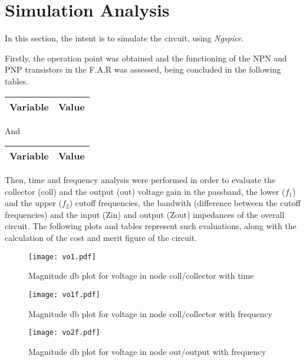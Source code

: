 \section{Simulation Analysis}
\label{sec:simulation}

In this section, the intent is to simulate the circuit, using \textit{Ngspice}. 

Firstly, the operation point was obtained and the functioning of the NPN and PNP transistors in the F.A.R was assessed, being concluded in the following tables.

\begin{center}
    \begin{tabular}{|l|r|}
      \hline    
      {\bf Variable} & {\bf Value} \\ \hline
      
    \end{tabular}
\end{center}

And

\begin{center}
    \begin{tabular}{|l|r|}
      \hline    
      {\bf Variable} & {\bf Value} \\ \hline
      
    \end{tabular}
\end{center}

Then, time and frequency analysis were performed in order to evaluate the collector (coll) and the output (out) voltage gain in the passband, the lower ($f_1$) and the upper ($f_2$) cutoff frequencies, the bandwith (difference between the cutoff frequencies) and the input (Zin) and output (Zout) impedances of the overall circuit. The following plots and tables represent such evaluations, along with the calculation of the cost and merit figure of the circuit.

\begin{figure}[h]
    \centering
    \texttt{[image: vo1.pdf]}
    \caption{Magnitude db plot for voltage in node coll/collector with time}
    \label{vo1}
\end{figure}

\begin{figure}[h]
    \centering
    \texttt{[image: vo1f.pdf]}
    \caption{Magnitude db plot for voltage in node coll/collector with frequency}
    \label{vo1f}
\end{figure}

\begin{figure}[h]
    \centering
    \texttt{[image: vo2f.pdf]}
    \caption{Magnitude db plot for voltage in node out/output with frequency}
    \label{vo2f}
\end{figure}

